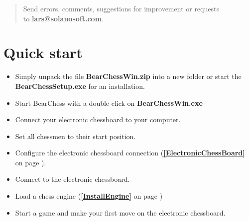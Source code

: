 \documentclass[11pt,a4paper]{article}
\begin{document}
\begin{abstract}
		Send errors, comments, suggestions for improvement or requests\\to \textbf{lars@solanosoft.com}.
		
	\end{abstract}
	
	\newpage
	\tableofcontents
	\newpage
	
	
	\section{Quick start}
	\begin{itemize}
		\item Simply unpack the file \textbf{BearChessWin.zip} into a new folder or start the\\ \textbf{BearChessSetup.exe} for an installation.
		\item Start BearChess with a double-click on \textbf{BearChessWin.exe}
		\item Connect your electronic chessboard to your computer.
		\item Set all chessmen to their start position.
		\item Configure the electronic chessboard connection (\textbf{\ref{ElectronicChessBoard}  } on page \pageref{ElectronicChessBoard}).
		\item Connect to the electronic chessboard.
		\item Load a chess engine (\textbf{\ref{InstallEngine}  } on page \pageref{InstallEngine})
		\item Start a game and make your first move on the electronic chessboard.
	\end{itemize}
	
	
\end{document}
